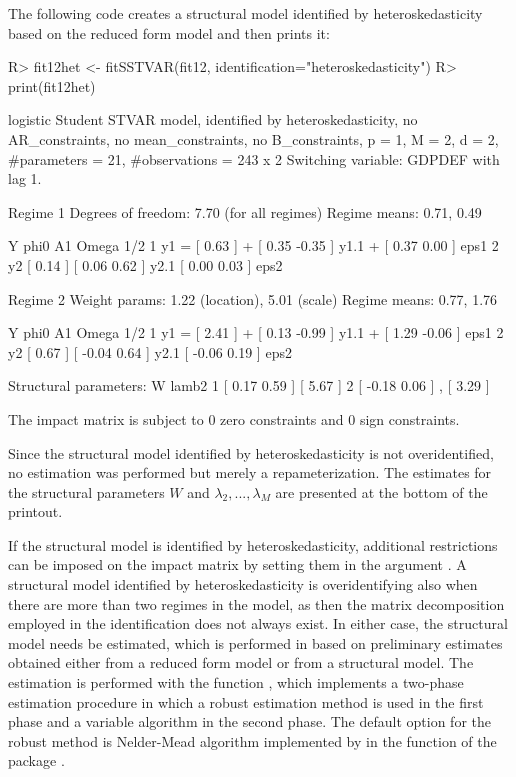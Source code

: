 \documentclass[nojss]{jss}
\begin{document}
The following code creates a structural model identified by heteroskedasticity based on the reduced form model  and then prints it:
\begin{CodeChunk}
\begin{CodeInput}
R> fit12het <- fitSSTVAR(fit12, identification="heteroskedasticity")
R> print(fit12het)
\end{CodeInput}
\begin{CodeOutput}
logistic Student STVAR model, identified by heteroskedasticity, no AR_constraints,
no mean_constraints, no B_constraints,
  p = 1, M = 2, d = 2, #parameters = 21, #observations = 243 x 2
  Switching variable: GDPDEF with lag 1.

Regime 1
Degrees of freedom: 7.70 (for all regimes)
Regime means: 0.71, 0.49

   Y     phi0          A1                  Omega        1/2
1 y1 = [ 0.63 ] + [  0.35 -0.35 ] y1.1 + [  0.37 0.00 ]     eps1
2 y2   [ 0.14 ]   [  0.06  0.62 ] y2.1   [  0.00 0.03 ]     eps2

Regime 2
Weight params: 1.22 (location), 5.01 (scale)
Regime means: 0.77, 1.76

   Y     phi0          A1                  Omega         1/2
1 y1 = [ 2.41 ] + [  0.13 -0.99 ] y1.1 + [  1.29 -0.06 ]     eps1
2 y2   [ 0.67 ]   [ -0.04  0.64 ] y2.1   [ -0.06  0.19 ]     eps2

Structural parameters:
        W             lamb2
1 [  0.17  0.59 ]   [  5.67 ]
2 [ -0.18  0.06 ] , [  3.29 ]

The impact matrix is subject to 0 zero constraints and 0 sign constraints.
\end{CodeOutput}
\end{CodeChunk}
%
Since the structural model identified by heteroskedasticity is not overidentified, no estimation was performed but merely a repameterization. The estimates for the structural parameters $W$ and $\lambda_2,...,\lambda_M$ are presented at the bottom of the printout.

If the structural model is identified by heteroskedasticity, additional restrictions can be imposed on the impact matrix by setting them in the argument . A structural model identified by heteroskedasticity is overidentifying also when there are more than two regimes in the model, as then the matrix decomposition employed in the identification does not always exist. In either case, the structural model needs be estimated, which is performed in  based on preliminary estimates obtained either from a reduced form model or from a structural model. The estimation is performed with the function , which implements a two-phase estimation procedure in which a robust estimation method is used in the first phase and a variable algorithm in the second phase. The default option for the robust method is Nelder-Mead algorithm implemented by \cite{R} in the function  of the package .
\end{document}
